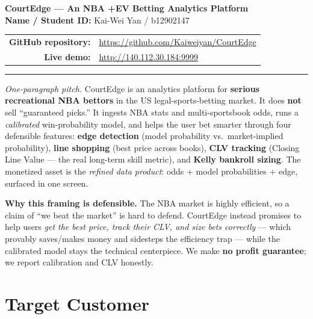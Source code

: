 \documentclass[12pt]{article}
\begin{document}
\begin{center}
{\Large \bf CourtEdge --- An NBA +EV Betting Analytics Platform}\\[4pt]
\textbf{Name / Student ID:} Kai-Wei Yan / b12902147\\[6pt]
\begin{tabular}{rl}
\textbf{GitHub repository:} & \url{https://github.com/Kaiweiyan/CourtEdge}\\[2pt]
\textbf{Live demo:} & \url{http://140.112.30.184:9999}\\
\end{tabular}
\end{center}

\hrule
\vspace{6pt}

\noindent\textit{One-paragraph pitch.} CourtEdge is an analytics platform for \textbf{serious
recreational NBA bettors} in the US legal-sports-betting market. It does \textbf{not} sell
``guaranteed picks.'' It ingests NBA stats and multi-sportsbook odds, runs a \emph{calibrated}
win-probability model, and helps the user bet smarter through four defensible features:
\textbf{edge detection} (model probability vs.\ market-implied probability), \textbf{line
shopping} (best price across books), \textbf{CLV tracking} (Closing Line Value --- the real
long-term skill metric), and \textbf{Kelly bankroll sizing}. The monetized asset is the
\emph{refined data product}: odds + model probabilities + edge, surfaced in one screen.

\begin{mdframed}
\small \textbf{Why this framing is defensible.} The NBA market is highly efficient, so a claim
of ``we beat the market'' is hard to defend. CourtEdge instead promises to help users
\emph{get the best price, track their CLV, and size bets correctly} --- which provably
saves/makes money and sidesteps the efficiency trap --- while the calibrated model stays the
technical centerpiece. We make \textbf{no profit guarantee}; we report calibration and CLV
honestly.
\end{mdframed}

\section{Target Customer}
\end{document}
